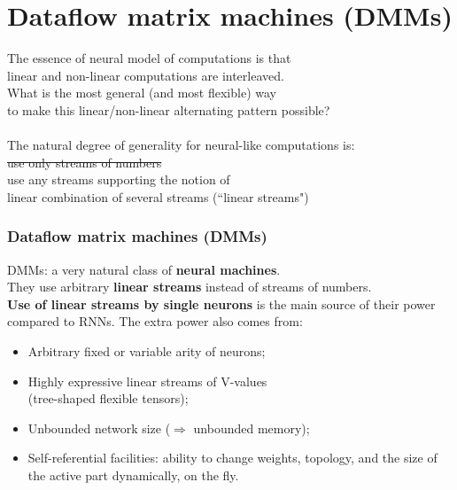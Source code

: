 \documentclass{beamer}
\newcommand{\msmagenta}[1]{{\color{mymagenta} #1}}
\begin{document}
\section{Dataflow matrix machines (DMMs)}

\begin{frame}

The essence of neural model of computations is that\\
\msmagenta{linear and non-linear computations are interleaved.}\\[2ex] 

What is the most general (and most flexible) way\\
to make this linear/non-linear alternating pattern possible?\\[2ex]

\dotfill\\[2ex]

The natural degree of generality for neural-like computations is:\\[2ex]
\hspace{0.2in}\sout{use only streams of numbers}\\
\hspace{0.2in}use any streams supporting the notion of\\
\hspace{0.6in}linear combination of several streams \msmagenta{(``linear streams")}

\end{frame}

\begin{frame}

  \frametitle{\msmagenta{Dataflow matrix machines (DMMs)}}

DMMs: a very natural class of {\bf neural machines}.\\[2ex]

They use arbitrary {\bf linear streams} instead of streams of numbers.\\[2ex]

{\bf Use of linear streams by single neurons} is the main source of their power compared to RNNs.
The extra power also comes from:\\[1ex]

\begin{itemize}

\item Arbitrary fixed or variable arity of neurons;\\[2ex]

\item Highly expressive linear streams of V-values\\ (tree-shaped flexible tensors);\\[2ex]

\item Unbounded network size ($\Rightarrow$ unbounded memory);\\[2ex]

\item Self-referential facilities: ability to change weights, topology, and the size of the active part dynamically, on the fly.

\end{itemize}

\end{frame}
\end{document}
